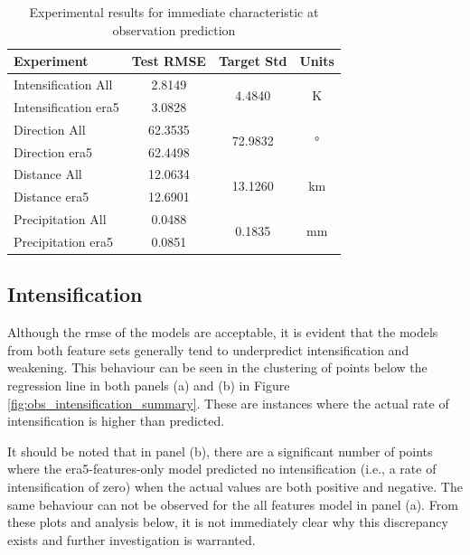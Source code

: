 \begin{table}[h!]
\centering
\caption{Experimental results for immediate characteristic at observation prediction}
\label{tab:obs_experiment_results}
\begin{tabular}{lccc}
\hline
\textbf{Experiment} & \textbf{Test RMSE} & \textbf{Target Std} & \textbf{Units} \\
\hline
Intensification All & 2.8149  & \multirow{2}{*}{4.4840}  & \multirow{2}{*}{\unit{\kelvin}} \\
Intensification \acrshort{era5} & 3.0828  & &  \\ \hline
Direction All & 62.3535 & \multirow{2}{*}{72.9832} & \multirow{2}{*}{\unit{\degree}} \\
Direction \acrshort{era5} & 62.4498 & & \\ \hline
Distance All & 12.0634 & \multirow{2}{*}{13.1260} & \multirow{2}{*}{\unit{\km}} \\
Distance \acrshort{era5} & 12.6901 & & \\ \hline
Precipitation All & 0.0488  & \multirow{2}{*}{0.1835}  & \multirow{2}{*}{\unit{\milli\meter}} \\
Precipitation \acrshort{era5} & 0.0851  & & \\
\hline
\end{tabular}
\end{table}

\clearpage
\subsection{Intensification}
\label{sec:results-intensification}

Although the \acrshort{rmse} of the models are acceptable, it is evident that the models from both feature sets generally tend to underpredict intensification and weakening. This behaviour can be seen in the clustering of points below the regression line in both panels (a) and (b) in Figure \ref{fig:obs_intensification_summary}. These are instances where the actual rate of intensification is higher than predicted. 

It should be noted that in panel (b), there are a significant number of points where the \acrshort{era5}-features-only model predicted no intensification (i.e., a rate of intensification of zero) when the actual values are both positive and negative. The same behaviour can not be observed for the all features model in panel (a). From these plots and analysis below, it is not immediately clear why this discrepancy exists and further investigation is warranted.

